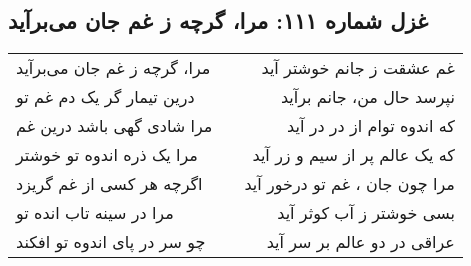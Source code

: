 \begin{center}
\section*{غزل شماره ۱۱۱: مرا، گرچه ز غم جان می‌برآید}
\label{sec:111}
\begin{longtable}{l p{0.5cm} r}
مرا، گرچه ز غم جان می‌برآید
&&
غم عشقت ز جانم خوشتر آید
\\
درین تیمار گر یک دم غم تو
&&
نپرسد حال من، جانم برآید
\\
مرا شادی گهی باشد درین غم
&&
که اندوه توام از در در آید
\\
مرا یک ذره اندوه تو خوشتر
&&
که یک عالم پر از سیم و زر آید
\\
اگرچه هر کسی از غم گریزد
&&
مرا چون جان ، غم تو درخور آید
\\
مرا در سینه تاب انده تو
&&
بسی خوشتر ز آب کوثر آید
\\
چو سر در پای اندوه تو افکند
&&
عراقی در دو عالم بر سر آید
\\
\end{longtable}
\end{center}
